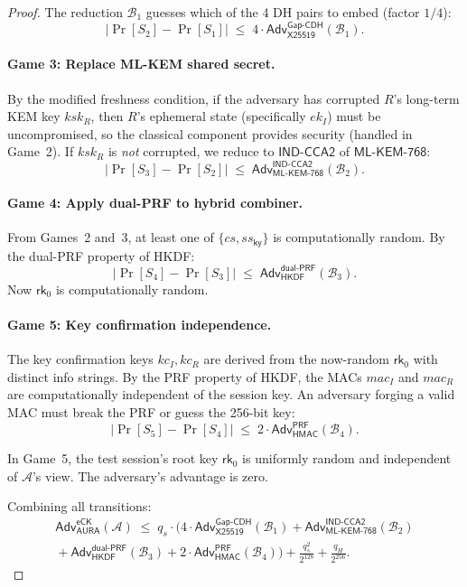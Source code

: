 \documentclass[11pt,a4paper]{article}
\theoremstyle{definition}
\theoremstyle{remark}
\newcommand{\adv}{\mathsf{Adv}}
\newcommand{\advA}{\mathcal{A}}
\newcommand{\advB}{\mathcal{B}}
\newcommand{\HKDF}{\mathsf{HKDF}}
\newcommand{\HMAC}{\mathsf{HMAC}}
\renewcommand{\DH}{\mathsf{X25519}}
\newcommand{\KEM}{\mathsf{ML\text{-}KEM\text{-}768}}
\newcommand{\GapCDH}{\mathsf{Gap\text{-}CDH}}
\newcommand{\INDCCA}{\mathsf{IND\text{-}CCA2}}
\newcommand{\PRF}{\mathsf{PRF}}
\newcommand{\dualPRF}{\mathsf{dual\text{-}PRF}}
\newcommand{\eCK}{\mathsf{eCK}}
\newcommand{\rk}{\mathsf{rk}}
\begin{document}
\begin{proof}
The reduction $\advB_1$ guesses which of the 4 DH pairs to embed (factor $1/4$):
\[
  |\Pr[S_2] - \Pr[S_1]| \;\leq\; 4 \cdot \adv^{\GapCDH}_{\DH}(\advB_1).
\]

\paragraph{Game 3: Replace ML-KEM shared secret.}
By the modified freshness condition, if the adversary has corrupted $R$'s
long-term KEM key $\mathit{ksk}_R$, then $R$'s ephemeral state (specifically
$ek_I$) must be uncompromised, so the classical component provides security
(handled in Game~2).  If $\mathit{ksk}_R$ is \emph{not} corrupted, we reduce
to $\INDCCA$ of $\KEM$:
\[
  |\Pr[S_3] - \Pr[S_2]| \;\leq\; \adv^{\INDCCA}_{\KEM}(\advB_2).
\]

\paragraph{Game 4: Apply dual-PRF to hybrid combiner.}
From Games~2 and~3, at least one of $\{\mathit{cs}, \mathit{ss}_{\mathsf{ky}}\}$
is computationally random.  By the dual-PRF property of HKDF:
\[
  |\Pr[S_4] - \Pr[S_3]| \;\leq\; \adv^{\dualPRF}_{\HKDF}(\advB_3).
\]
Now $\rk_0$ is computationally random.

\paragraph{Game 5: Key confirmation independence.}
The key confirmation keys $\mathit{kc}_I, \mathit{kc}_R$ are derived from the
now-random $\rk_0$ with distinct info strings.  By the PRF property of HKDF,
the MACs $\mathit{mac}_I$ and $\mathit{mac}_R$ are computationally independent
of the session key.  An adversary forging a valid MAC must break the PRF or
guess the 256-bit key:
\[
  |\Pr[S_5] - \Pr[S_4]| \;\leq\; 2 \cdot \adv^{\PRF}_{\HMAC}(\advB_4).
\]

In Game~5, the test session's root key $\rk_0$ is uniformly random and
independent of $\advA$'s view.  The adversary's advantage is zero.

Combining all transitions:
\begin{multline*}
  \adv^{\eCK}_{\mathsf{AURA}}(\advA) \;\leq\;
  q_s \cdot \bigl(4 \cdot \adv^{\GapCDH}_{\DH}(\advB_1) +
  \adv^{\INDCCA}_{\KEM}(\advB_2) \\
  {} + \adv^{\dualPRF}_{\HKDF}(\advB_3)
  + 2 \cdot \adv^{\PRF}_{\HMAC}(\advB_4)\bigr)
  + \frac{q_s^2}{2^{128}} + \frac{q_H}{2^{256}}.
\end{multline*}
\end{proof}
\end{document}
